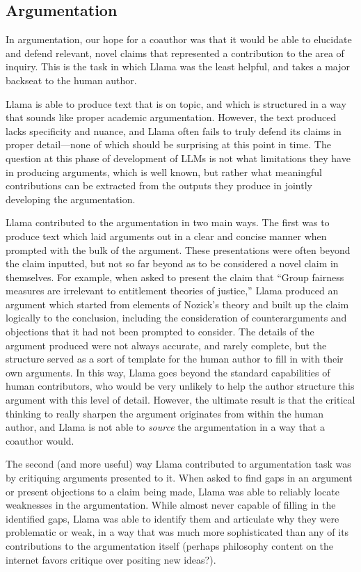 \subsection{Argumentation}

In argumentation, our hope for a coauthor was that it would be able to elucidate
and defend relevant, novel claims that represented a contribution to the area
of inquiry. This is the task in which Llama was the least helpful, and takes 
a major backseat to the human author.

Llama is able to produce text that is on topic, and which is structured in a way
that sounds like proper academic argumentation. However, the text produced lacks
specificity and nuance, and Llama often fails to truly defend its claims in 
proper detail—none of which should be surprising at this point in time. The
question at this phase of development of LLMs is not what limitations they have
in producing arguments, which is well known, but rather what meaningful 
contributions can be extracted from the outputs they produce in jointly
developing the argumentation.

Llama contributed to the argumentation in two main ways. The first was to
produce text which laid arguments out in a clear and concise manner when
prompted with the bulk of the argument. These presentations were often beyond
the claim inputted, but not so far beyond as to be considered a novel claim in
themselves. For example, when asked to present the claim that ``Group fairness
measures are irrelevant to entitlement theories of justice,'' Llama produced an
argument which started from elements of Nozick's theory and built up the claim
logically to the conclusion, including the consideration of counterarguments and 
objections that it had not been prompted to consider. The details of the
argument produced were not always accurate, and rarely complete, but the
structure served as a sort of template for the human author to fill in with
their own arguments. In this way, Llama goes beyond the standard capabilities of
human contributors, who would be very unlikely to help the author structure this
argument with this level of detail. However, the ultimate result is that the
critical thinking to really sharpen the argument originates from within the
human author, and Llama is not able to \emph{source} the argumentation in a way
that a coauthor would.

The second (and more useful) way Llama contributed to argumentation task was by
critiquing arguments presented to it. When asked to find gaps in an argument or
present objections to a claim being made, Llama was able to reliably locate 
weaknesses in the argumentation. While almost never capable of filling in the
identified gaps, Llama was able to identify them and articulate why they were
problematic or weak, in a way that was much more sophisticated than any of its
contributions to the argumentation itself (perhaps philosophy content on the 
internet favors critique over positing new ideas?).

